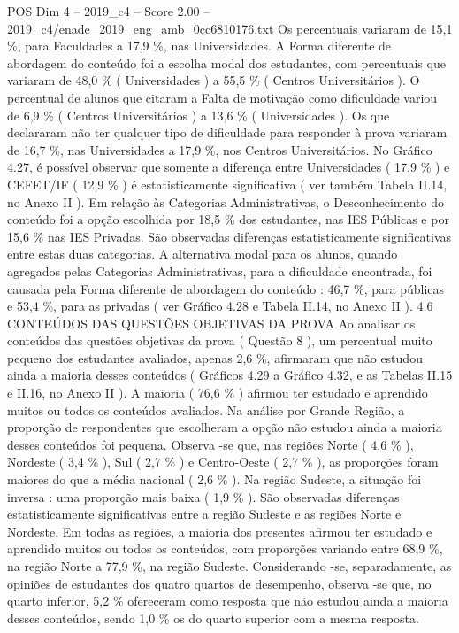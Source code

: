 \begin{textsample}{POS Dim 4 – 2019\_c4 – Score 2.00 – 2019\_c4/enade\_2019\_eng\_amb\_0cc6810176.txt}
Os percentuais variaram de 15,1 \%, para Faculdades a 17,9 \%, nas Universidades.
A Forma diferente de abordagem do conteúdo foi a escolha modal dos estudantes, com percentuais que variaram de 48,0 \% ( Universidades ) a 55,5 \% ( Centros Universitários ).
O percentual de alunos que citaram a Falta de motivação como dificuldade variou de 6,9 \% ( Centros Universitários ) a 13,6 \% ( Universidades ).
Os que declararam não ter qualquer tipo de dificuldade para responder à prova variaram de 16,7 \%, nas Universidades a 17,9 \%, nos Centros Universitários.
No Gráfico 4.27, é possível observar que somente a diferença entre Universidades ( 17,9 \% ) e CEFET/IF ( 12,9 \% ) é estatisticamente significativa ( ver também Tabela II.14, no Anexo II ).
Em relação às Categorias Administrativas, o Desconhecimento do conteúdo foi a opção escolhida por 18,5 \% dos estudantes, nas IES Públicas e por 15,6 \% nas IES Privadas.
São observadas diferenças estatisticamente significativas entre estas duas categorias.
A alternativa modal para os alunos, quando agregados pelas Categorias Administrativas, para a dificuldade encontrada, foi causada pela Forma diferente de abordagem do conteúdo : 46,7 \%, para públicas e 53,4 \%, para as privadas ( ver Gráfico 4.28 e Tabela II.14, no Anexo II ). 4.6 CONTEÚDOS DAS QUESTÕES OBJETIVAS DA PROVA Ao analisar os conteúdos das questões objetivas da prova ( Questão 8 ), um percentual muito pequeno dos estudantes avaliados, apenas 2,6 \%, afirmaram que não estudou ainda a maioria desses conteúdos ( Gráficos 4.29 a Gráfico 4.32, e as Tabelas II.15 e II.16, no Anexo II ).
A maioria ( 76,6 \% ) afirmou ter estudado e aprendido muitos ou todos os conteúdos avaliados.
Na análise por Grande Região, a proporção de respondentes que escolheram a opção não estudou ainda a maioria desses conteúdos foi pequena.
Observa -se que, nas regiões Norte ( 4,6 \% ), Nordeste ( 3,4 \% ), Sul ( 2,7 \% ) e Centro-Oeste ( 2,7 \% ), as proporções foram maiores do que a média nacional ( 2,6 \% ).
Na região Sudeste, a situação foi inversa : uma proporção mais baixa ( 1,9 \% ).
São observadas diferenças estatisticamente significativas entre a região Sudeste e as regiões Norte e Nordeste.
Em todas as regiões, a maioria dos presentes afirmou ter estudado e aprendido muitos ou todos os conteúdos, com proporções variando entre 68,9 \%, na região Norte a 77,9 \%, na região Sudeste.
Considerando -se, separadamente, as opiniões de estudantes dos quatro quartos de desempenho, observa -se que, no quarto inferior, 5,2 \% ofereceram como resposta que não estudou ainda a maioria desses conteúdos, sendo 1,0 \% os do quarto superior com a mesma resposta.

\end{textsample}
